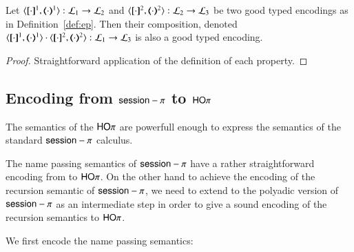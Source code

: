 \begin{proposition}
	Let $\encod{\cdot}{\cdot}{1}: \tyl{L}_1 \to \tyl{L}_2$ and $\encod{\cdot}{\cdot}{2}: \tyl{L}_2 \to \tyl{L}_3$
	be two good typed encodings as in Definition~\ref{def:ep}.
	Then their composition, denoted 
	$\encod{\cdot}{\cdot}{1} \cdot \encod{\cdot}{\cdot}{2}: \tyl{L}_1 \to \tyl{L}_3$
	is also a good typed encoding.
\end{proposition}

\begin{proof}
	Straightforward application of the definition of each property.
\end{proof}

\subsection{Encoding from $\mathsf{session}-\pi$ to $\mathsf{HO}\pi$}

The semantics of the $\mathsf{HO}\pi$ are powerfull enough to
express the semantics of the standard $\mathsf{session}-\pi$ calculus.

The name passing semantics of $\mathsf{session}-\pi$ have a rather straightforward
encoding from to $\mathsf{HO}\pi$.
On the other hand to achieve the encoding of the recursion semantic
of $\mathsf{session}-\pi$, we need to extend
to the polyadic version of $\mathsf{session}-\pi$ as an intermediate step in order
to give a sound encoding of the recursion semantics to $\mathsf{HO}\pi$.

We first encode the name passing semantics:


